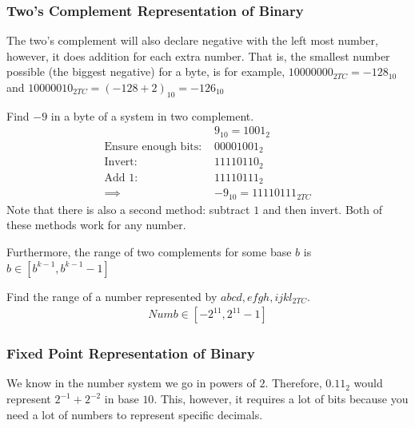 \documentclass[a4paper]{article}
\theoremstyle{plain}
\theoremstyle{definition}
\newtheorem{exmp}{Example}[section]
\theoremstyle{remark}
\begin{document}
\subsubsection{Two's Complement Representation of Binary}
The two's complement will also declare negative with the left most number, however, it does addition for each extra number. That is, the smallest number possible (the biggest negative) for a byte, is for example, $10000000_{2TC}=-128_{10}$ and $10000010_{2TC}=(-128+2)_{10}=-126_{10}$
\begin{tcolorbox}[colback=black!3!white,colframe=black!60!white,title=\begin{exmp}Finding Two Complement Numbers \label{Finding Two Complement Numbers}\end{exmp}]
Find $-9$ in a byte of a system in two complement.
                \begin{align}
		&9_{10}=1001_2\\
		\text{Ensure enough bits: }& 00001001_2\\
		\text{Invert:} & 11110110_2\\
		\text{Add 1:} & 11110111_2\\
		\implies & -9_{10} = 11110111_{2TC}
                \end{align}
		Note that there is also a second method: subtract $1$ and then invert. Both of these methods work for any number.
\end{tcolorbox}
 Furthermore, the range of two complements for some base $b$ is $b \in [b^{k-1},b^{k-1}-1]$
 \begin{tcolorbox}[colback=black!3!white,colframe=black!60!white,title=\begin{exmp}Find the range \label{Find the range}\end{exmp}]
 Find the range of a number represented by $abcd,efgh,ijkl_{2TC}$. 
                 \begin{align}
			 Numb \in [-2^{11}, 2^{11}-1]
                 \end{align}
 \end{tcolorbox}
\subsubsection{Fixed Point Representation of Binary}
We know in the number system we go in powers of $2$. Therefore, $0.11_2$ would represent $2^{-1}+2^{-2}$ in base $10$. This, however, it requires a lot of bits because you need a lot of numbers to represent specific decimals.
\end{document}
